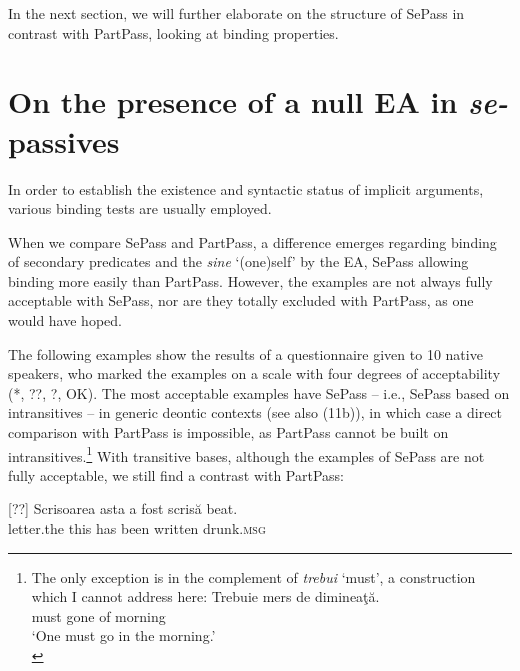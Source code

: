 \documentclass[output=paper]{langsci/langscibook}
\begin{document}
In the next section, we will further elaborate on the structure of SePass in contrast with PartPass, looking at binding properties.

\section{On the presence of a null EA in \textit{se-}passives}%
 
In order to establish the existence and syntactic status of implicit arguments, various binding tests are usually employed.
 
When we compare SePass and PartPass, a difference emerges regarding binding of secondary predicates and the  \textit{sine} ‘(one)self’ by the EA, SePass allowing binding more easily than PartPass. However, the examples are not always fully acceptable with SePass, nor are they totally excluded with PartPass, as one would have hoped.
 
The following examples show the results of a questionnaire given to 10 native speakers, who marked the examples on a scale with four degrees of acceptability (*, ??, ?, OK). The most acceptable examples have  SePass – i.e., SePass based on intransitives – in generic deontic contexts (see also (11b)), in which case a direct comparison with PartPass is impossible, as PartPass cannot be built on intransitives.\footnote{The only exception is in the complement of \textit{trebui} ‘must’, a construction which I cannot address here:
\ea \gll  Trebuie mers de dimineaţă.\\
    must     gone  of morning\\
    \glt ‘One must go in the morning.’\\
    \z} With transitive bases, although the examples of SePass are not fully acceptable, we still find a contrast with PartPass:

\settowidth{}
\ea%
    \label{ex:giurgea:41}
    \begin{xlista}
[??]{
    \gll Scrisoarea asta a    fost   scrisă   beat.        \\
         letter.the   this has been written drunk.\textsc{msg}\\}
\end{xlista}
\z
\end{document}
